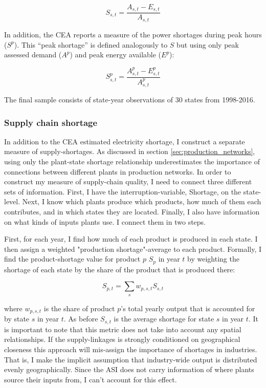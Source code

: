 \documentclass[11pt]{article}
\begin{document}
\[
S_{s,t} = \frac{A_{s,t} - E_{s,t} }{A_{s,t}}
\]

In addition, the CEA reports a measure of the power shortages during peak hours (\(S^p\)). This ``peak shortage'' is defined analogously to \(S\) but using only peak assessed demand (\(A^{p}\)) and peak energy available (\(E^p\)):

\[
S^{p}_{s,t} = \frac{A^{p}_{s,t} - E^{p}_{s,t}}{A^{p}_{s,t}}
\]

The final sample consists of state-year observations of 30 states from 1998-2016. 

\subsubsection{Supply chain shortage}%
\label{sub:supply_chain_quality}

In addition to the CEA estimated electricity shortage, I construct a separate measure of supply-shortages. As discussed in section \ref{sec:production_networks}, using only the plant-state shortage relationship underestimates the importance of connections between different plants in production networks. In order to construct my measure of supply-chain quality, I need to connect three different sets of information. First, I have the interruption-variable, Shortage, on the state-level. Next, I know which plants produce which products, how much of them each contributes, and in which states they are located. Finally, I also have information on what kinds of inputs plants use. I connect them in two steps.

First, for each year, I find how much of each product is produced in each state. I then assign a weighted "production shortage"-average to each product. Formally, I find the product-shortage value for product $p$ $S_{p}$ in year $t$ by weighting the shortage of each state by the share of the product that is produced there:

\[
S_{p,t} =  \sum_s w_{p,s,t} S_{s,t}
\]

where $w_{p,s,t}$ is the share of product $p$'s total yearly output that is accounted for by state $s$ in year $t$. As before $S_{s,t}$ is the average shortage for state $s$ in year $t$. It is important to note that this metric does not take into account any spatial relationships. If the supply-linkages is strongly conditioned on geographical closeness this approach will mis-assign the importance of shortages in industries. That is, I make the implicit assumption that industry-wide output is distributed evenly geographically. Since the ASI does not carry information of where plants source their inputs from, I can't account for this effect.
\end{document}
